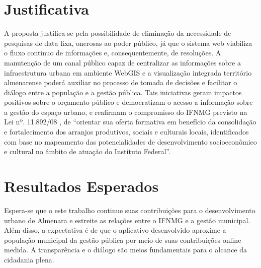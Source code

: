 \section*{Justificativa}
A proposta justifica-se pela possibilidade de eliminação da necessidade de pesquisas de data fixa, onerosas ao poder público, já que o sistema web viabiliza o fluxo continuo de informações e, consequentemente, de resoluções. A manutenção de um canal público capaz de centralizar as informações sobre a infraestrutura urbana em ambiente WebGIS e a visualização integrada território almenarense poderá auxiliar no processo de tomada de decisões e facilitar o diálogo entre a população e a gestão pública. Tais iniciativas geram impactos positivos sobre o orçamento público e democratizam o acesso a informação sobre a gestão do espaço urbano, e reafirmam o compromisso do IFNMG previsto na Lei nº. 11.892/08 , de “orientar sua oferta formativa em benefício da consolidação e fortalecimento dos arranjos produtivos, sociais e culturais locais, identificados com base no mapeamento das potencialidades de desenvolvimento socioeconômico e cultural no âmbito de atuação do Instituto Federal”.

\section*{Resultados Esperados}
Espera-se que o este trabalho continue suas contribuições para o desenvolvimento urbano de Almenara e estreite as relações entre o IFNMG e a gestão municipal. Além disso, a expectativa é de que o aplicativo desenvolvido aproxime a população municipal da gestão pública por meio de suas contribuições online medida. A transparência e o diálogo são meios fundamentais para o alcance da cidadania plena.

